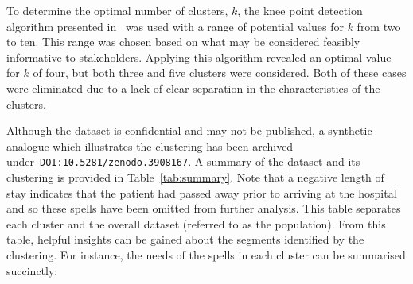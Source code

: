 \documentclass[]{interact}
\theoremstyle{plain}%
\theoremstyle{definition}
\theoremstyle{remark}
\begin{document}
To determine the optimal number of clusters, \(k\), the knee point detection
algorithm presented in~\cite{Satopaa2011} was used with a range of potential
values for \(k\) from two to ten. This range was chosen based on what may be
considered feasibly informative to stakeholders. Applying this algorithm
revealed an optimal value for \(k\) of four, but both three and five clusters
were considered. Both of these cases were eliminated due to a lack of clear
separation in the characteristics of the clusters.

\begin{table}
    \centering
    \resizebox{\textwidth}{!}{}
    \caption{%
        A summary of clinical and condition-specific characteristics for each
        cluster and the population
    }
    \label{tab:summary}
\end{table}

Although the dataset is confidential and may not be published, a synthetic
analogue which illustrates the clustering has been archived
under~\texttt{DOI:10.5281/zenodo.3908167}. A summary of the dataset and its
clustering is provided in Table~\ref{tab:summary}. Note that a negative length
of stay indicates that the patient had passed away prior to arriving at the
hospital and so these spells have been omitted from further analysis. This table
separates each cluster and the overall dataset (referred to as the population).
From this table, helpful insights can be gained about the segments identified by
the clustering. For instance, the needs of the spells in each cluster can be
summarised succinctly:
\end{document}
